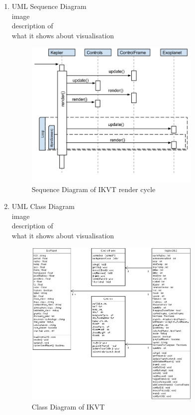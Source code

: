 \begin{enumerate}


 \item UML Sequence Diagram
  \\image\\description of\\what it shows about visualisation
   \begin{figure}[H]
  \centering
      \includegraphics[width=0.8\textwidth]{images/sequence.png}
  \caption{Sequence Diagram of IKVT render cycle}  
\end{figure}

 \item UML Class Diagram
 \\image\\description of\\what it shows about visualisation
 \begin{figure}[H]
  \centering
      \includegraphics[width=0.8\textwidth]{images/classDiagram.png}
  \caption{Class Diagram of IKVT}  
\end{figure}
 

\end{enumerate}

